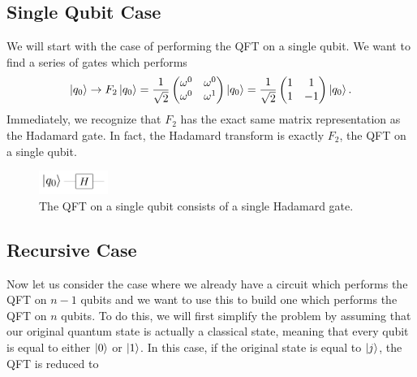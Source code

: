 \documentclass[11pt]{report}
\newcommand{\?}{\stackrel{?}{=}}
\begin{document}
\subsection{Single Qubit Case}
We will start with the case of performing the QFT on a single qubit. We want to find a series of gates which performs
$$\ket{q_0} \to F_2\ket{q_0} = \frac{1}{\sqrt{2}}\begin{pmatrix}\omega^0 & \omega^0 \\ \omega^0 & \omega^1 \end{pmatrix} \Ket{q_0} = \frac{1}{\sqrt{2}}\begin{pmatrix}1 & 1 \\ 1 & -1 \end{pmatrix} \Ket{q_0}.$$
Immediately, we recognize that $F_2$ has the exact same matrix representation as the Hadamard gate. In fact, the Hadamard transform is exactly $F_2$, the QFT on a single qubit.
  
\begin{figure}[h]
\centering
\includegraphics[width=0.2\textwidth]{resources/images/hadamard.png}
\caption{\label{fig:Hadamard}The QFT on a single qubit consists of a single Hadamard gate.}
\end{figure}

\subsection{Recursive Case}
Now let us consider the case where we already have a circuit which performs the QFT on $n-1$ qubits and we want to use this to build one which performs the QFT on $n$ qubits. To do this, we will first simplify the problem by assuming that our original quantum state is actually a classical state, meaning that every qubit is equal to either $\Ket{0}$ or $\Ket{1}$. In this case, if the original state is equal to $\Ket{j}$, the QFT is reduced to
\end{document}
